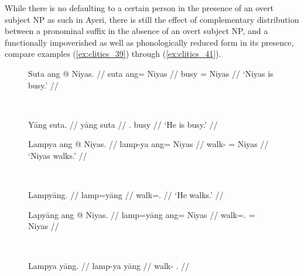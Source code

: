 While there is no defaulting to a certain person in the presence of
an overt subject NP as such in Ayeri, there is still the effect of complementary
distribution between a pronominal suffix in the absence of an overt subject NP,
and a functionally impoverished as well as phonologically reduced form in its
presence, compare examples (\ref{ex:clitics_39}) through (\ref{ex:clitics_41}).

\begin{figure}
\ex{}\label{ex:clitics_39}
\begin{minipage}[t]{.5\remaining}
\tl\quad\label{ex:clitics_39a}\begingl
	\gla Suta ang @ Niyas. //
	\glb suta ang= Niyas //
	\glc busy \Aarg{}= Niyas //
	\glft `Niyas is busy.' //
\endgl
\end{minipage}
~
\begin{minipage}[t]{.5\remaining}
\tl\quad\label{ex:clitics_39b}\begingl
	\gla Yāng suta. //
	\glb yāng suta //
	\glc \TsgM{}.\Aarg{} busy //
	\glft `He is busy.' //
\endgl
\end{minipage}
\xe\smallskip

\ex{}\label{ex:clitics_40}
\begin{minipage}[t]{.5\remaining}
\tl\quad\label{ex:clitics_40a}\begingl
	\gla Lampya ang @ Niyas. //
	\glb lamp-ya ang= Niyas //
	\glc walk-\TsgM{} \Aarg{}= Niyas //
	\glft `Niyas walks.' //
\endgl
\end{minipage}
~
\begin{minipage}[t]{.5\remaining}
\tl\quad\label{ex:clitics_40b}\begingl
	\gla Lampyāng. //
	\glb lamp=yāng //
	\glc walk=\TsgM{}.\Aarg{} //
	\glft `He walks.' //
\endgl
\end{minipage}
\xe\smallskip

\ex{}\label{ex:clitics_41}
\begin{minipage}[t]{.5\remaining}
\tl\quad\label{ex:clitics_41a}\ljudge{*}\begingl
	\gla Lapyāng ang @ Niyas. //
	\glb lamp=yāng ang= Niyas //
	\glc walk=\TsgM{}.\Aarg{} \Aarg{}= Niyas //
\endgl
\end{minipage}
~
\begin{minipage}[t]{.5\remaining}
\tl\quad\label{ex:clitics_41b}\ljudge{*}\begingl
	\gla Lampya yāng. //
	\glb lamp-ya yāng //
	\glc walk-\TsgM{} \TsgM{}.\Aarg{} //
\endgl
\end{minipage}
\xe
\end{figure}

